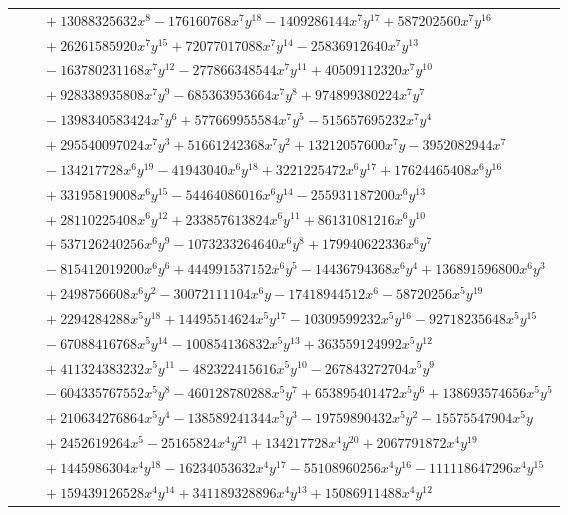 \documentclass[11pt]{article}
\begin{document}
\begin{longtable}{@{}ll@{}}
 & $\quad +13088325632x^{8}-176160768x^{7}y^{18}-1409286144x^{7}y^{17}+587202560x^{7}y^{16}$\\
 & $\quad +26261585920x^{7}y^{15}+72077017088x^{7}y^{14}-25836912640x^{7}y^{13}$\\
 & $\quad -163780231168x^{7}y^{12}-277866348544x^{7}y^{11}+40509112320x^{7}y^{10}$\\
 & $\quad +928338935808x^{7}y^{9}-685363953664x^{7}y^{8}+974899380224x^{7}y^{7}$\\
 & $\quad -1398340583424x^{7}y^{6}+577669955584x^{7}y^{5}-515657695232x^{7}y^{4}$\\
 & $\quad +295540097024x^{7}y^{3}+51661242368x^{7}y^{2}+13212057600x^{7}y-3952082944x^{7}$\\
 & $\quad -134217728x^{6}y^{19}-41943040x^{6}y^{18}+3221225472x^{6}y^{17}+17624465408x^{6}y^{16}$\\
 & $\quad +33195819008x^{6}y^{15}-54464086016x^{6}y^{14}-255931187200x^{6}y^{13}$\\
 & $\quad +28110225408x^{6}y^{12}+233857613824x^{6}y^{11}+86131081216x^{6}y^{10}$\\
 & $\quad +537126240256x^{6}y^{9}-1073233264640x^{6}y^{8}+179940622336x^{6}y^{7}$\\
 & $\quad -815412019200x^{6}y^{6}+444991537152x^{6}y^{5}-14436794368x^{6}y^{4}+136891596800x^{6}y^{3}$\\
 & $\quad +2498756608x^{6}y^{2}-30072111104x^{6}y-17418944512x^{6}-58720256x^{5}y^{19}$\\
 & $\quad +2294284288x^{5}y^{18}+14495514624x^{5}y^{17}-10309599232x^{5}y^{16}-92718235648x^{5}y^{15}$\\
 & $\quad -67088416768x^{5}y^{14}-100854136832x^{5}y^{13}+363559124992x^{5}y^{12}$\\
 & $\quad +411324383232x^{5}y^{11}-482322415616x^{5}y^{10}-267843272704x^{5}y^{9}$\\
 & $\quad -604335767552x^{5}y^{8}-460128780288x^{5}y^{7}+653895401472x^{5}y^{6}+138693574656x^{5}y^{5}$\\
 & $\quad +210634276864x^{5}y^{4}-138589241344x^{5}y^{3}-19759890432x^{5}y^{2}-15575547904x^{5}y$\\
 & $\quad +2452619264x^{5}-25165824x^{4}y^{21}+134217728x^{4}y^{20}+2067791872x^{4}y^{19}$\\
 & $\quad +1445986304x^{4}y^{18}-16234053632x^{4}y^{17}-55108960256x^{4}y^{16}-111118647296x^{4}y^{15}$\\
 & $\quad +159439126528x^{4}y^{14}+341189328896x^{4}y^{13}+15086911488x^{4}y^{12}$\\

\end{longtable}
\end{document}
